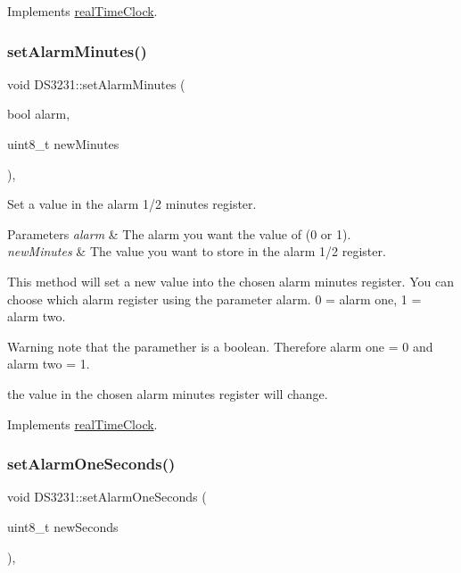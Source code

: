 Implements \mbox{\hyperlink{classreal_time_clock_a9f0cd64ce9a783f149fcbb9f7eb36524}{real\+Time\+Clock}}.

\mbox{\label{class_d_s3231_a9c1f5b183c24f3062c1c8c299f46023c}} 
\subsubsection{\texorpdfstring{set\+Alarm\+Minutes()}{setAlarmMinutes()}}
{\footnotesize\ttfamily void D\+S3231\+::set\+Alarm\+Minutes (\begin{DoxyParamCaption}\item[{bool}]{alarm,  }\item[{uint8\+\_\+t}]{new\+Minutes }\end{DoxyParamCaption})\hspace{0.3cm}{\ttfamily [override]}, {\ttfamily [virtual]}}



Set a value in the alarm 1/2 minutes register. 


\begin{DoxyParams}{Parameters}
{\em alarm} & The alarm you want the value of (0 or 1). \\
\hline
{\em new\+Minutes} & The value you want to store in the alarm 1/2 register.\\
\hline
\end{DoxyParams}
This method will set a new value into the chosen alarm minutes register. You can choose which alarm register using the parameter alarm. 0 = alarm one, 1 = alarm two. \begin{DoxyWarning}{Warning}
note that the paramether is a boolean. Therefore alarm one = 0 and alarm two = 1. 

the value in the chosen alarm minutes register will change. 
\end{DoxyWarning}


Implements \mbox{\hyperlink{classreal_time_clock_a53ffba88cd87d05af58288fb4fc589b5}{real\+Time\+Clock}}.

\mbox{\label{class_d_s3231_ae294f3c8c8634a058846cf9864ccc5c8}} 
\subsubsection{\texorpdfstring{set\+Alarm\+One\+Seconds()}{setAlarmOneSeconds()}}
{\footnotesize\ttfamily void D\+S3231\+::set\+Alarm\+One\+Seconds (\begin{DoxyParamCaption}\item[{uint8\+\_\+t}]{new\+Seconds }\end{DoxyParamCaption})\hspace{0.3cm}{\ttfamily [override]}, {\ttfamily [virtual]}}



